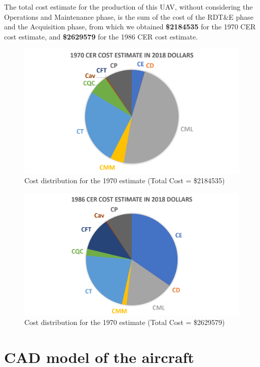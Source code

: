 \documentclass[english,fira]{ist-report}
\begin{document}
The total cost estimate for the production of this UAV, without considering the Operations and Maintenance phase, is the sum of the cost of the RDT\&E phase and the Acquisition phase, from which we obtained \textbf{\$2184535} for the 1970 CER cost estimate, and \textbf{\$2629579} for the 1986 CER cost estimate. 
\begin{figure}[ht]
    \centering
    \includegraphics[width=\textwidth]{graphics/COST/1970.png}
    \caption{Cost distribution for the 1970 estimate (Total Cost = \$2184535) }
    \label{fig:1970cer}
\end{figure}
\begin{figure}[ht]
    \centering
    \includegraphics[width=\textwidth]{graphics/COST/1986.png}
    \caption{Cost distribution for the 1970 estimate (Total Cost = \$2629579)}
    \label{fig:1986cer}
\end{figure}




\chapter{CAD model of the aircraft}\label{chap:cad}
\end{document}
